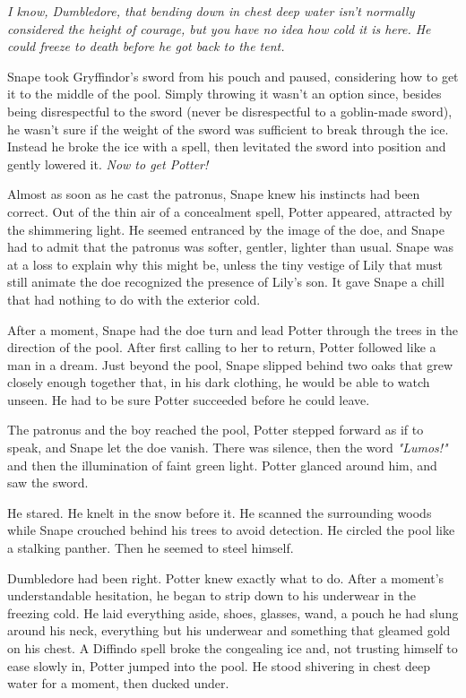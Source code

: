 \emph{I know, Dumbledore, that bending down in chest deep water isn't normally considered the height of courage, but you have no idea how cold it is here. He could freeze to death before he got back to the tent.}

Snape took Gryffindor's sword from his pouch and paused, considering how to get it to the middle of the pool. Simply throwing it wasn't an option since, besides being disrespectful to the sword (never be disrespectful to a goblin-made sword), he wasn't sure if the weight of the sword was sufficient to break through the ice. Instead he broke the ice with a spell, then levitated the sword into position and gently lowered it. \emph{Now to get Potter!}

Almost as soon as he cast the patronus, Snape knew his instincts had been correct. Out of the thin air of a concealment spell, Potter appeared, attracted by the shimmering light. He seemed entranced by the image of the doe, and Snape had to admit that the patronus was softer, gentler, lighter than usual. Snape was at a loss to explain why this might be, unless the tiny vestige of Lily that must still animate the doe recognized the presence of Lily's son. It gave Snape a chill that had nothing to do with the exterior cold.

After a moment, Snape had the doe turn and lead Potter through the trees in the direction of the pool. After first calling to her to return, Potter followed like a man in a dream. Just beyond the pool, Snape slipped behind two oaks that grew closely enough together that, in his dark clothing, he would be able to watch unseen. He had to be sure Potter succeeded before he could leave.

The patronus and the boy reached the pool, Potter stepped forward as if to speak, and Snape let the doe vanish. There was silence, then the word \emph{"Lumos!"} and then the illumination of faint green light. Potter glanced around him, and saw the sword.

He stared. He knelt in the snow before it. He scanned the surrounding woods while Snape crouched behind his trees to avoid detection. He circled the pool like a stalking panther. Then he seemed to steel himself.

Dumbledore had been right. Potter knew exactly what to do. After a moment's understandable hesitation, he began to strip down to his underwear in the freezing cold. He laid everything aside, shoes, glasses, wand, a pouch he had slung around his neck, everything but his underwear and something that gleamed gold on his chest. A Diffindo spell broke the congealing ice and, not trusting himself to ease slowly in, Potter jumped into the pool. He stood shivering in chest deep water for a moment, then ducked under.

